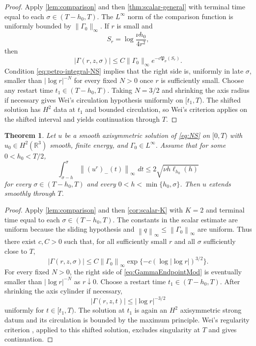 \documentclass[11pt]{article}
\numberwithin{equation}{section}
\newtheorem{theorem}{Theorem}[section]
\theoremstyle{definition}
\newcommand{\R}{\mathbb R}
\newcommand{\dd}{\,d}
\newcommand{\Gam}{\Gamma}
\newcommand{\norm}[1]{\left\lVert #1\right\rVert}
\begin{document}
\begin{proof}
Apply \cref{lem:comparison} and then \cref{thm:scalar-general} with terminal time equal to each $\sigma\in(T-h_0,T)$.  The $L^\infty$ norm of the comparison function is uniformly bounded by $\|\Gamma_0\|_\infty$.  If $r$ is small and
\[
 S_r=\log\frac{\nu h_0}{4r^2},
\]
then
\[
 |\Gamma(r,z,\sigma)|
 \le C\|\Gamma_0\|_\infty e^{-c\mathfrak P_\sigma(S_r)}.
\]
Condition \eqref{eq:petro-integral-NS} implies that the right side is, uniformly in late $\sigma$, smaller than $|\log r|^{-N}$ for every fixed $N>0$ once $r$ is sufficiently small.  Choose any restart time $t_1\in(T-h_0,T)$.  Taking $N=3/2$ and shrinking the axis radius if necessary gives Wei's circulation hypothesis uniformly on $[t_1,T)$.  The shifted solution has $H^2$ data at $t_1$ and bounded circulation, so Wei's criterion \cite{Wei2016} applies on the shifted interval and yields continuation through $T$.
\end{proof}

\begin{theorem}\label{thm:petro-NS}
Let $u$ be a smooth axisymmetric solution of \eqref{eq:NS} on $[0,T)$ with $u_0\in H^2(\R^3)$ smooth, finite energy, and $\Gam_0\in L^\infty$.  Assume that for some $0<h_0<T/2$,
\begin{equation}\label{eq:petroNS}
 \int_{\sigma-h}^{\sigma}\norm{(u^r)_-(t)}_\infty\,\dd t
 \le2\sqrt{\nu h\ell_{h_0}(h)}
\end{equation}
for every $\sigma\in(T-h_0,T)$ and every $0<h<\min\{h_0,\sigma\}$.  Then $u$ extends smoothly through $T$.
\end{theorem}

\begin{proof}
Apply \cref{lem:comparison} and then \cref{cor:scalar-K} with $K=2$ and terminal time equal to each $\sigma\in(T-h_0,T)$.  The constants in the scalar estimate are uniform because the sliding hypothesis and $\norm{q}_\infty\le\norm{\Gam_0}_\infty$ are uniform.  Thus there exist $c,C>0$ such that, for all sufficiently small $r$ and all $\sigma$ sufficiently close to $T$,
\begin{equation}\label{eq:GammaEndpointMod}
 |\Gam(r,z,\sigma)|
 \le C\norm{\Gam_0}_\infty
 \exp\{-c(\log|\log r|)^{3/2}\}.
\end{equation}
For every fixed $N>0$, the right side of \eqref{eq:GammaEndpointMod} is eventually smaller than $|\log r|^{-N}$ as $r\downarrow0$.  Choose a restart time $t_1\in(T-h_0,T)$.  After shrinking the axis cylinder if necessary,
\[
 |\Gam(r,z,t)|\le |\log r|^{-3/2}
\]
uniformly for $t\in[t_1,T)$.  The solution at $t_1$ is again an $H^2$ axisymmetric strong datum and its circulation is bounded by the maximum principle.  Wei's regularity criterion \cite{Wei2016}, applied to this shifted solution, excludes singularity at $T$ and gives continuation.
\end{proof}
\end{document}
